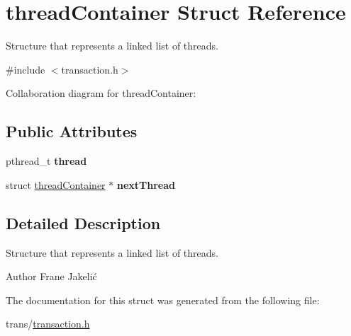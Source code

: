 \hypertarget{structthreadContainer}{}\section{thread\+Container Struct Reference}
\label{structthreadContainer}


Structure that represents a linked list of threads.  




{\ttfamily \#include $<$transaction.\+h$>$}



Collaboration diagram for thread\+Container\+:
\subsection*{Public Attributes}
\begin{DoxyCompactItemize}
\item 
pthread\+\_\+t {\bfseries thread}\hypertarget{structthreadContainer_aec4a9c751d5d1202bafdfbb769c4a3b0}{}\label{structthreadContainer_aec4a9c751d5d1202bafdfbb769c4a3b0}

\item 
struct \hyperlink{structthreadContainer}{thread\+Container} $\ast$ {\bfseries next\+Thread}\hypertarget{structthreadContainer_a07e020d387df3d860a0cee5d5e8d4237}{}\label{structthreadContainer_a07e020d387df3d860a0cee5d5e8d4237}

\end{DoxyCompactItemize}


\subsection{Detailed Description}
Structure that represents a linked list of threads. 

\begin{DoxyAuthor}{Author}
Frane Jakelić 
\end{DoxyAuthor}


The documentation for this struct was generated from the following file\+:\begin{DoxyCompactItemize}
\item 
trans/\hyperlink{transaction_8h}{transaction.\+h}\end{DoxyCompactItemize}
